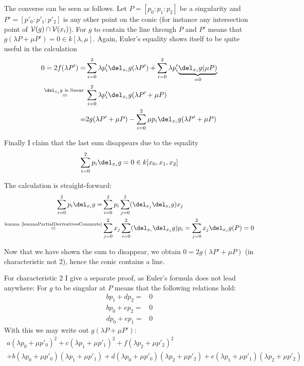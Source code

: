 The converse can be seen as follows. Let $P=[p_0:p_1:p_2]$ be a singularity and $P'=[p'_0:p'_1:p'_2]$ is any other point on the conic (for instance any intersection point of $\operatorname{\mathcal V}(g) \cap \operatorname{\mathcal V}(x_i)$).
For $g$ to contain the line through $P$ and $P'$ means that $g(\lambda P + \mu P') = 0 \in k[\lambda,\mu]$.
Again, Euler's equality shows itself to be quite useful in the calculation
\begin{align}
0
= 2f(\lambda P')
=& \sum_{i=0}^2 \lambda p'_i \del_{x_i}g(\lambda P') 
+ \sum_{i=0}^2 \lambda p'_i \underset{=0}{\underbrace{\del_{x_i}g(\mu P)}}
\\
\overset{\del_{x_i}g\text{ is linear }}=& \sum_{i=0}^2 \lambda p'_i \del_{x_i} g(\lambda P'+\mu P) 
\\
=& 2g(\lambda P' + \mu P) - \sum_{i=0}^2 \mu p_i \del_{x_i}g(\lambda P' + \mu P)
\end{align}

Finally I claim that the last sum disappears due to the equality
\begin{equation}
\sum_{i=0}^2 p_i \del_{x_i}g = 0 \in k[x_0,x_1,x_2]
\end{equation}

The calculation is straight-forward:
\begin{align}
\sum_{i=0}^2 p_i \del_{x_i} g
=& \sum_{i=0}^2 p_i \sum_{j=0}^2 (\del_{x_j}\del_{x_i}g)x_j
\\
\overset{\text{lemma \ref{lemmaPartialDerivativesCommute}}}=& \sum_{j=0}^2 x_j \sum_{i=0}^2 (\del_{x_i}\del_{x_j}g)p_i = \sum_{j=0}^2 x_j \del_{x_j}g(P) = 0
\end{align}

Now that we have shown the sum to disappear, we obtain $0 = 2g(\lambda P' + \mu P)$ (in characteristic not 2), hence the conic contains a line.

For characteristic 2 I give a separate proof, as Euler's formula does not lead anywhere:
For $g$ to be singular at $P$ means that the following relations hold:
\begin{align}
bp_1 + dp_2 =& 0\\
bp_0 + ep_2 =& 0\\
dp_0 + ep_1 =& 0
\end{align}
With this we may write out $g(\lambda P + \mu P')$:
\begin{align}
a(\lambda p_0 + \mu p'_0)^2
+c(\lambda p_1 + \mu p'_1)^2
+f(\lambda p_2 + \mu p'_2)^2 \\
+b (\lambda p_0 + \mu p'_0)(\lambda p_1 + \mu p'_1)
+d (\lambda p_0 + \mu p'_0)(\lambda p_2 + \mu p'_2)
+e (\lambda p_1 + \mu p'_1)(\lambda p_2 + \mu p'_2)
\end{align}

